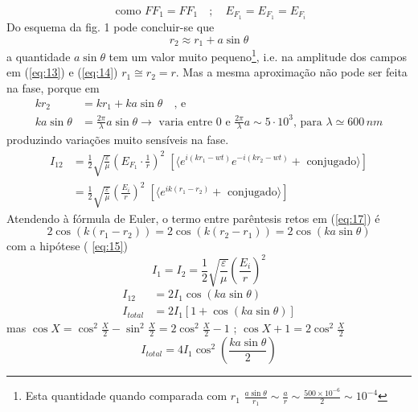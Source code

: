 \documentclass[a4paper,12pt]{article}
\begin{document}
\begin{equation}
	\label{eq:15} \text{ como } F F_1 = F F_1 \quad ; \quad E_{F_1} = E_{F_1} = E_{F_i} 
\end{equation}
Do esquema da fig. 1 pode concluir-se que 
\begin{equation}
	\label{eq:16} r_2 \approx r_1 + a \sin \theta 
\end{equation}
a quantidade $ a \sin \theta $ tem um valor muito pequeno\footnote{Esta quantidade quando comparada com $ r_1$ \; $ \frac{a \sin \theta }{r_1 } \sim \frac{a}{r } \sim \frac{ 500 \times 10^{-6} }{2 } \sim 10^{-4}$},
i.e. na amplitude dos campos em (\ref{eq:13}) e (\ref{eq:14}) $ r_1 \cong r_2 = r$. 
Mas a mesma aproximação não pode ser feita na fase, porque em 
\begin{align}
	k r_2 &= k r_1 +k a \sin \theta \quad \text{, e } \nonumber \\
	k a \sin \theta &= \frac{ 2 \pi }{\lambda } a \sin \theta  \rightarrow \text{ varia entre } 0 \text{ e } \frac{ 2 \pi}{\lambda} a \sim 5 \cdot 10^{3} \text{, para }  \lambda \simeq 600\,nm  \nonumber 
\end{align}
produzindo variações muito sensíveis na fase. 
\begin{align}
	\label{eq:17} I_{12} &=\frac{1}{2}\sqrt{\frac{ \varepsilon}{\mu}} \left(E_{F_1} \cdot \frac{1}{r }\right)^2 \; \left[ \langle e^{ i (k r_1 -wt )} e^{ -i (k r_2 -wt ) } + \text{ conjugado} \rangle \right] \nonumber \\
	&= \frac{1}{2}\sqrt{\frac{ \varepsilon}{\mu}} \left(\frac{E_i}{r }\right)^2 \; \left[ \langle e^{ i k (r_1 - r_2) } + \text{ conjugado} \rangle \right] 
\end{align}
Atendendo à fórmula de Euler, o termo entre parêntesis retos  em (\ref{eq:17}) é 
\begin{equation*}
	2 \cos ( k (r_1 - r_2) ) = 2 \cos ( k (r_2 - r_1) ) = 2 \cos ( k a \sin \theta ) 
\end{equation*}
com a hipótese ( \ref{eq:15}) 
\begin{equation}
	\label{eq:18} I_1= I_2 = \frac{1}{2}\sqrt{\frac{ \varepsilon}{\mu}} (\frac{E_i}{r })^2 
\end{equation}
\begin{align}
	I_{12} &= 2 I_1 \cos ( k a \sin \theta ) \\
	I_{total} &= 2 I_1 \left[ 1 + \cos ( k a \sin \theta ) \right ] 
\end{align}
mas $ \cos X = \cos^2 \frac{X}{2} - \sin^2 \frac{X}{2} = 2 \cos^2 \frac{X}{2} - 1$ ; $ \cos X +1 = 2 \cos^2 \frac{X}{2}$
\begin{equation}
	\label{eq:21} I_{total} = 4 I_1 \cos^2 (\frac{k a \sin \theta }{2} ) 
\end{equation}
\end{document}
